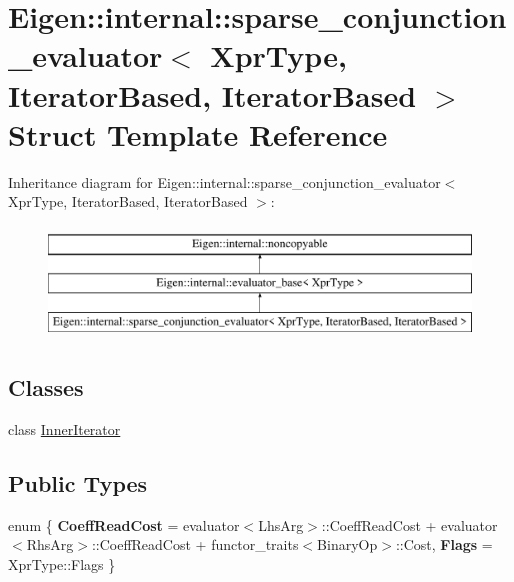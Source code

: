 \hypertarget{struct_eigen_1_1internal_1_1sparse__conjunction__evaluator_3_01_xpr_type_00_01_iterator_based_00_01_iterator_based_01_4}{}\section{Eigen\+::internal\+::sparse\+\_\+conjunction\+\_\+evaluator$<$ Xpr\+Type, Iterator\+Based, Iterator\+Based $>$ Struct Template Reference}
\label{struct_eigen_1_1internal_1_1sparse__conjunction__evaluator_3_01_xpr_type_00_01_iterator_based_00_01_iterator_based_01_4}
Inheritance diagram for Eigen\+::internal\+::sparse\+\_\+conjunction\+\_\+evaluator$<$ Xpr\+Type, Iterator\+Based, Iterator\+Based $>$\+:\begin{figure}[H]
\begin{center}
\leavevmode
\includegraphics[height=3.000000cm]{struct_eigen_1_1internal_1_1sparse__conjunction__evaluator_3_01_xpr_type_00_01_iterator_based_00_01_iterator_based_01_4}
\end{center}
\end{figure}
\subsection*{Classes}
\begin{DoxyCompactItemize}
\item 
class \mbox{\hyperlink{class_eigen_1_1internal_1_1sparse__conjunction__evaluator_3_01_xpr_type_00_01_iterator_based_00_c2f169adc5f8760251f1bd99603a9afc}{Inner\+Iterator}}
\end{DoxyCompactItemize}
\subsection*{Public Types}
\begin{DoxyCompactItemize}
\item 
\mbox{\label{struct_eigen_1_1internal_1_1sparse__conjunction__evaluator_3_01_xpr_type_00_01_iterator_based_00_01_iterator_based_01_4_ada9b1142197673aaca824e8858a0974f}} 
enum \{ {\bfseries Coeff\+Read\+Cost} = evaluator$<$Lhs\+Arg$>$\+::Coeff\+Read\+Cost + evaluator$<$Rhs\+Arg$>$\+::Coeff\+Read\+Cost + functor\+\_\+traits$<$Binary\+Op$>$\+::Cost, 
{\bfseries Flags} = Xpr\+Type\+::Flags
 \}
\end{DoxyCompactItemize}
